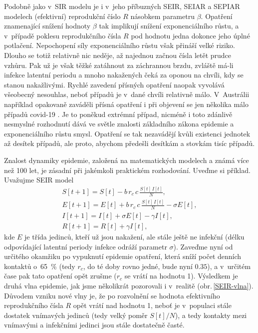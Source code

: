 Podobně jako v~SIR modelu je i v~jeho příbuzných SEIR, SEIAR a SEPIAR modelech (efektivní) reprodukční číslo $R$ násobkem parametru $\beta$. Opatření znamenající snížení hodnoty $\beta$ tak implikují snížení exponenciálního růstu, a v~případě poklesu reprodukčního čísla $R$ pod hodnotu jedna dokonce jeho úplné potlačení. Nepochopení síly exponenciálního růstu však přináší velké riziko. Dlouho se totiž relativně nic neděje, až najednou začnou čísla letět prudce vzhůru. Pak už je však těžké zatáhnout za záchrannou brzdu, zvláště má-li infekce latentní periodu a mnoho nakažených čeká za oponou na chvíli, kdy se stanou nakažlivými. Rychlé zavedení přísných opatření naopak vyvolává všeobecný nesouhlas, neboť případů je v~dané chvíli relativně málo. V~Austrálii například opakovaně zaváděli přísná opatření i při objevení se jen několika málo případů covid-19 \cite{australia_opatreni}. Je to poněkud extrémní případ, nicméně i toto zdánlivě nesmyslné rozhodnutí dává ve světle znalosti základního zákona epidemie a exponenciálního růstu smysl. Opatření se tak nezavádějí kvůli existenci jednotek až desítek případů, ale proto, abychom předešli desítkám a stovkám tisíc případů. 

Znalost dynamiky epidemie, založená na matematických modelech a známá více než 100 let, je zásadní při jakémkoli praktickém rozhodování. Uveďme si příklad. Uvažujme SEIR model
\begin{equation}
	\begin{array}{l}
		\displaystyle{S[t+1] = S[t] - b\,r_c\,c \, \frac{S[t]\,I[t]}{N}}, \\[3ex]
		\displaystyle{E[t+1] = E[t] + b\,r_c\,c \, \frac{S[t]\,I[t]}{N} - \sigma E[t]}, \\[3ex]
		\displaystyle{I[t+1] = I[t] + \sigma E[t] - \gamma I[t]}, \\[3ex]
		\displaystyle{R[t+1] = R[t] + \gamma I[t]},
	\end{array}
	\label{SEIR1}
\end{equation}
kde $E$ je třída jedinců, kteří už jsou nakažení, ale stále ještě ne infekční (délku odpovídající latentní periody infekce odráží parametr $\sigma$). Zaveďme nyní od určitého okamžiku po vypuknutí epidemie opatření, která sníží počet denních kontaktů o~65~\% (tedy $r_c$, do té doby rovno jedné, bude nyní $0.35$), a v~určitém čase pak tato opatření opět zrušme ($r_c$ se vrátí na hodnotu 1). Výsledkem je druhá vlna epidemie, jak jsme několikrát pozorovali i v~realitě (obr.\,\ref{SEIR-vlna}). Důvodem vzniku nové vlny je, že po rozvolnění se hodnota efektivního reprodukčního čísla $R$ opět vrátí nad hodnotu 1, neboť je v~populaci stále dostatek vnímavých jedinců (tedy velký poměr $S[t]/N$), a tedy kontakty mezi vnímavými a infekčními jedinci jsou stále dostatečně časté.

